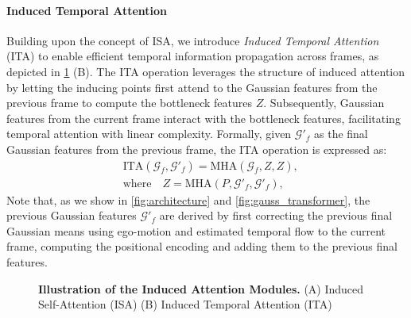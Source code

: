 \documentclass[10pt,twocolumn,letterpaper]{article}
\begin{document}
\paragraph{Induced Temporal Attention}
Building upon the concept of ISA, we introduce \emph{Induced Temporal Attention} (ITA) to enable efficient temporal information propagation across frames, as depicted in \cref{fig:induced_attn} (B).
The ITA operation leverages the structure of induced attention by letting the inducing points first attend to the Gaussian features from the previous frame to compute the bottleneck features $Z$.
Subsequently, Gaussian features from the current frame interact with the bottleneck features, facilitating temporal attention with linear complexity.
Formally, given $\mathcal{G}'_f$ as the final Gaussian features from the previous frame, the ITA operation is expressed as:
\begin{align}
    &\ \mathrm{ITA}(\mathcal{G}_f, \mathcal{G}'_f)= \mathrm{MHA}(\mathcal{G}_f, Z, Z), \; \\
    &\ \text{where} \quad Z = \mathrm{MHA}(P, \mathcal{G}'_f, \mathcal{G}'_f),
    \label{eq:induced_temp}
\end{align}
Note that, as we show in \cref{fig:architecture} and \cref{fig:gauss_transformer}, the previous Gaussian features $\mathcal{G}'_f$ are derived by first correcting the previous final Gaussian means using ego-motion and estimated temporal flow to the current frame, computing the positional encoding and adding them to the previous final features.

\begin{figure}
    \centering
    \caption{
        \textbf{Illustration of the Induced Attention Modules.} 
        (A) Induced Self-Attention (ISA) 
        (B) Induced Temporal Attention (ITA)}
    \label{fig:induced_attn}
    \vspace{-4mm}
\end{figure}
\end{document}
